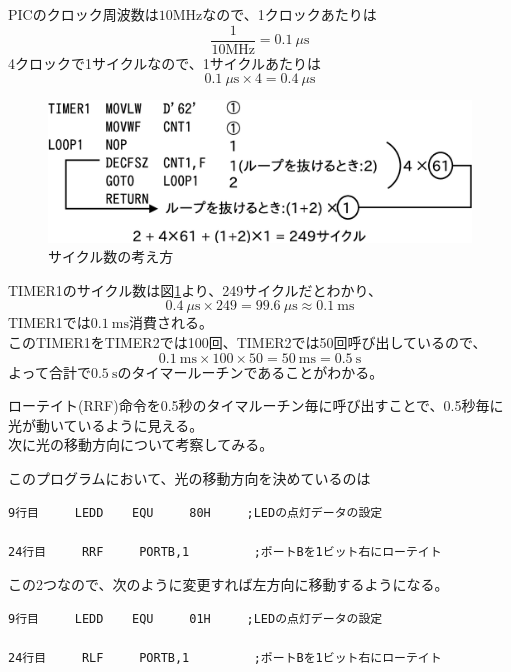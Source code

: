 \documentclass[a4paper,12pt]{ujarticle}
\begin{document}
   PICのクロック周波数は$10\si{\mega\hertz}$なので、1クロックあたりは
    \[
     \frac{1}{10\si{\mega\hertz}} = \SI{0.1}{\mu\second}
    \]
    4クロックで1サイクルなので、1サイクルあたりは
    \[
     \SI{0.1}{\mu\second} \times 4 = \SI{0.4}{\mu\second}
    \]
     \begin{figure}[h]
      \begin{center}
       \includegraphics[width=130mm]{Diagram5.eps}
      \end{center}
      \caption{サイクル数の考え方}
      \label{fig:sicle}
     \end{figure}
     TIMER1のサイクル数は図\ref{fig:sicle}より、249サイクルだとわかり、
     \[
      \SI{0.4}{\mu\second} \times 249 = \SI{99.6}{\mu\second} \approx \SI{0.1}{\milli\second}
     \]
     TIMER1では$\SI{0.1}{\milli\second}$消費される。\\
     このTIMER1をTIMER2では100回、TIMER2では50回呼び出しているので、
     \[
      \SI{0.1}{\milli\second} \times 100 \times 50 = \SI{50}{\milli\second} = \SI{0.5}{\second}
     \]
    よって合計で$\SI{0.5}{\second}$のタイマールーチンであることがわかる。

     ローテイト(RRF)命令を0.5秒のタイマルーチン毎に呼び出すことで、0.5秒毎に光が動いているように見える。
     \\

     次に光の移動方向について考察してみる。

     このプログラムにおいて、光の移動方向を決めているのは
      \begin{lstlisting}[basicstyle=\ttfamily\footnotesize, frame=single]
 9行目     LEDD    EQU     80H     ;LEDの点灯データの設定

24行目     RRF     PORTB,1         ;ポートBを1ビット右にローテイト
      \end{lstlisting}

      この2つなので、次のように変更すれば左方向に移動するようになる。
      \begin{lstlisting}[basicstyle=\ttfamily\footnotesize, frame=single]
 9行目     LEDD    EQU     01H     ;LEDの点灯データの設定

24行目     RLF     PORTB,1         ;ポートBを1ビット右にローテイト
      \end{lstlisting}
\end{document}
